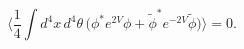 \begin{equation}
\Big\langle \frac{1}{4}\int d^4x\,d^4\theta\,\Big(\phi^* e^{2V}\phi
+ \tilde\phi^* e^{-2V}\tilde\phi\Big)\Big\rangle = 0.
\end{equation}

